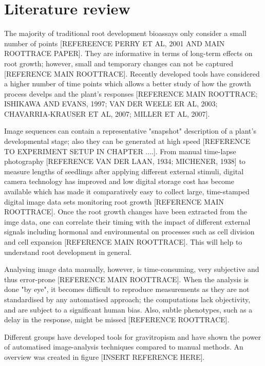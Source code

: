 \section{Literature review}

The majority of traditional root development bioassays only consider a small number of points [REFEREENCE PERRY ET AL, 2001 AND MAIN ROOTTRACE PAPER]. They are informative in terms of long-term effects on root growth; however, small and temporary changes can not be captured [REFERENCE MAIN ROOTTRACE].
Recently developed tools have considered a higher number of time points which allows a better study of how the growth process develps and the plant's responses [REFERENCE MAIN ROOTTRACE; ISHIKAWA AND EVANS, 1997; VAN DER WEELE ER AL, 2003; CHAVARRIA-KRAUSER ET AL, 2007; MILLER ET AL, 2007].  

Image sequences can contain a representative "snapshot" description of a plant's developmental stage; also they can be generated at high speed [REFERENCE TO EXPERIMENT SETUP IN CHAPTER ....]. From manual time-lapse photography [REFERENCE VAN DER LAAN, 1934; MICHENER, 1938] to measure lengths of seedlings after applying different external stimuli, digital camera  technology has improved and low digital storage cost has become available which has made it comparatively easy to collect large, time-stamped digital image data sets monitoring root growth [REFERENCE MAIN ROOTTRACE].  
Once the root growth changes have been extracted from the imge data, one can correlate their timing with the impact of different external signals including hormonal and environmental on processes such as cell division and cell expansion [REFERENCE MAIN ROOTTRACE]. This will help to understand root development in general. 

Analysing image data manually, however, is time-consuming, very subjective and thus error-prone [REFERENCE MAIN ROOTTRACE]. When the analysis is done "by eye", it becomes difficult to reproduce measurements as they are not standardised by any automatised approach; the computations lack objectivity, and are subject to a significant human bias. Also, subtle phenotypes, such as a delay in the response, might be missed [REFERENCE ROOTTRACE]. 

Different groups have developed tools for gravitropism and have shown the power of automatised image-analysis techniques compared to manual methods. An overview was created in figure [INSERT REFERENCE HERE].


